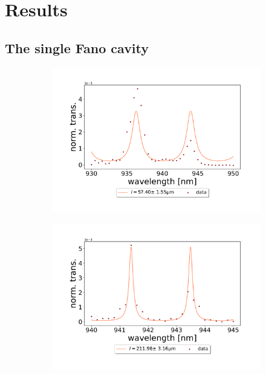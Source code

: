 \section{Results}

\subsection{The single Fano cavity}

\begin{figure}[h!]
    \centering
    \begin{subfigure}[b]{0.49\textwidth}
        \centering
        \includegraphics[width=\textwidth]{figures/results/single fano fits/60um_off_res_fabry_perot.pdf}
        \caption{}
        \label{fig:short_single_fano_FSR}
    \end{subfigure}
    \begin{subfigure}[b]{0.49\textwidth}
        \centering
        \includegraphics[width=\textwidth]{figures/results/single fano fits/220um_off_res_fabry_perot.pdf}
        \caption{}
        \label{fig:long_single_fano_FSR}
    \end{subfigure}
\end{figure}

